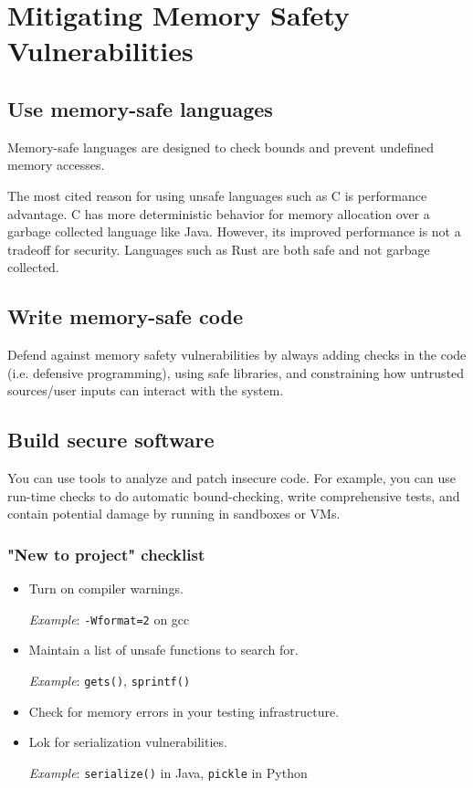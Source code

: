 \chapter{Mitigating Memory Safety Vulnerabilities}

\section{Use memory-safe languages}
Memory-safe languages are designed to check bounds and prevent undefined memory accesses. 

\medskip

The most cited reason for using unsafe languages such as C is performance advantage. C has more deterministic behavior for memory allocation over a garbage collected language like Java. However, its improved performance is not a tradeoff for security. Languages such as Rust are both safe and not garbage collected.

\section{Write memory-safe code}
Defend against memory safety vulnerabilities by always adding checks in the code (i.e. defensive programming), using safe libraries, and constraining how untrusted sources/user inputs can interact with the system.

\section{Build secure software}
You can use tools to analyze and patch insecure code. For example, you can use run-time checks to do automatic bound-checking, write comprehensive tests, and contain potential damage by running in sandboxes or VMs.

\subsection{"New to project" checklist}
\begin{itemize}
    \item Turn on compiler warnings.
    
    \emph{Example}: \texttt{-Wformat=2} on gcc
    
    \item Maintain a list of unsafe functions to search for.
    
    \emph{Example}: \texttt{gets()}, \texttt{sprintf()}
    
    \item Check for memory errors in your testing infrastructure.
    
    \item Lok for serialization vulnerabilities.
    
    \emph{Example}: \texttt{serialize()} in Java, \texttt{pickle} in Python
\end{itemize}

